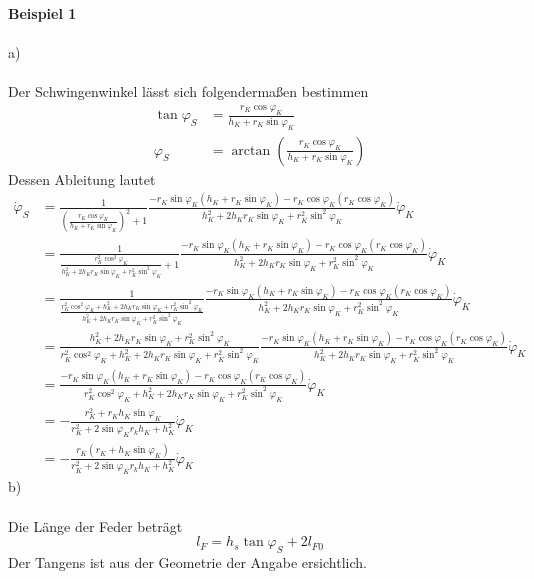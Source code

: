 \textbf{Beispiel 1} \\ \\
a) \\ \\
Der Schwingenwinkel lässt sich folgendermaßen bestimmen
\begin{align*}
	\tan\varphi_S &= \frac{r_K\cos\varphi_K}{h_K + r_K\sin\varphi_K} \\
	\varphi_S &= \arctan\left( \frac{r_K\cos\varphi_K}{h_K + r_K\sin\varphi_K}\right)
\end{align*}
Dessen Ableitung lautet
\begin{align*}
	\dot{\varphi}_S &= \frac{1}{\left( \frac{r_K\cos\varphi_K}{h_K + r_K\sin\varphi_K}\right)^2 + 1} \frac{-r_K\sin\varphi_K(h_K + r_K\sin\varphi_K) - r_K\cos\varphi_K(r_K\cos\varphi_K)}{h_K^2 + 2h_Kr_K\sin\varphi_K + r_K^2\sin^2\varphi_K}\dot{\varphi}_K\\
	&= \frac{1}{\frac{r_K^2\cos^2\varphi_K}{h_K^2 + 2h_Kr_K\sin\varphi_K + r_K^2\sin^2\varphi_K} + 1}\frac{-r_K\sin\varphi_K(h_K + r_K\sin\varphi_K) - r_K\cos\varphi_K(r_K\cos\varphi_K)}{h_K^2 + 2h_Kr_K\sin\varphi_K + r_K^2\sin^2\varphi_K}\dot{\varphi}_K \\
	&= \frac{1}{\frac{r_K^2\cos^2\varphi_K + h_K^2 + 2h_Kr_K\sin\varphi_K + r_K^2\sin^2\varphi_K}{h_K^2 + 2h_Kr_K\sin\varphi_K + r_K^2\sin^2\varphi_K}}\frac{-r_K\sin\varphi_K(h_K + r_K\sin\varphi_K) - r_K\cos\varphi_K(r_K\cos\varphi_K)}{h_K^2 + 2h_Kr_K\sin\varphi_K + r_K^2\sin^2\varphi_K}\dot{\varphi}_K \\
	&= \frac{h_K^2 + 2h_Kr_K\sin\varphi_K + r_K^2\sin^2\varphi_K}{r_K^2\cos^2\varphi_K + h_K^2 + 2h_Kr_K\sin\varphi_K + r_K^2\sin^2\varphi_K}\frac{-r_K\sin\varphi_K(h_K + r_K\sin\varphi_K) - r_K\cos\varphi_K(r_K\cos\varphi_K)}{h_K^2 + 2h_Kr_K\sin\varphi_K + r_K^2\sin^2\varphi_K}\dot{\varphi}_K \\
	&= \frac{-r_K\sin\varphi_K(h_K + r_K\sin\varphi_K) - r_K\cos\varphi_K(r_K\cos\varphi_K)}{r_K^2\cos^2\varphi_K + h_K^2 + 2h_Kr_K\sin\varphi_K + r_K^2\sin^2\varphi_K}\dot{\varphi}_K \\
	&= -\frac{r_K^2 + r_Kh_K\sin\varphi_K}{r_K^2 + 2\sin\varphi_Kr_kh_K + h_K^2}\dot{\varphi}_K\\
	&= -\frac{r_K(r_K + h_K\sin\varphi_K)}{r_K^2 + 2\sin\varphi_Kr_kh_K + h_K^2}\dot{\varphi}_K
\end{align*}
b) \\ \\
Die Länge der Feder beträgt
\[
	l_F = h_s\tan\varphi_S + 2l_{F0}
\]
Der Tangens ist aus der Geometrie der Angabe ersichtlich. \\ \\
